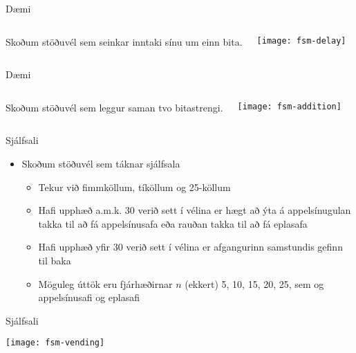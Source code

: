 \documentclass{beamer}
\begin{document}
\begin{frame}{Dæmi}
\begin{columns}
Skoðum stöðuvél sem seinkar inntaki sínu um einn bita.

\texttt{[image: fsm-delay]}
\end{columns}

\end{frame}

\begin{frame}{Dæmi}
\begin{columns}
Skoðum stöðuvél sem leggur saman tvo bitastrengi. \pause

\texttt{[image: fsm-addition]}
\end{columns}
\end{frame}

\begin{frame}{Sjálfsali}
\begin{itemize}
 \item Skoðum stöðuvél sem táknar sjálfsala
 \begin{itemize}
  \item Tekur við fimmköllum, tíköllum og 25-köllum
  \item Hafi upphæð a.m.k. 30 verið sett í vélina er hægt að ýta á appelsínugulan takka til að fá appelsínusafa eða rauðan takka til að fá eplasafa
  \item Hafi upphæð yfir 30 verið sett í vélina er afgangurinn samstundis gefinn til baka
  \item Möguleg úttök eru fjárhæðirnar $n$ (ekkert) 5, 10, 15, 20, 25, sem og appelsínusafi og eplasafi
 \end{itemize}
\end{itemize}
\end{frame}

\begin{frame}{Sjálfsali}
\begin{center}
\texttt{[image: fsm-vending]}
\end{center}
\end{frame}
\end{document}
